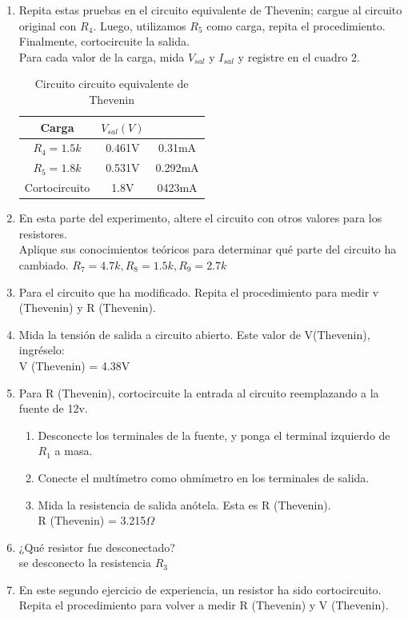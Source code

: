 \begin{enumerate}
\item Repita estas pruebas en el circuito equivalente de Thevenin; cargue al circuito original con $R_{4}$. Luego, utilizamos $R_{5}$ como carga, repita el procedimiento. Finalmente, cortocircuite la salida.
\\ 
Para cada valor de la carga, mida $V_{sal}$ y $I_{sal}$ y registre en el cuadro 2.
\begin{table}[h]
	\centering
	\begin{tabular}{|c|c|c|}
		\hline
		\textbf{Carga}&\textbf{$V_{sal} (V)$}&\text{$I_{sal} (mA)$}\\
		\hline
		$R_{4}=1.5k$&0.461V&0.31mA\\
		\hline
		$R_{5}=1.8k$&0.531V&0.292mA\\
		\hline
		Cortocircuito&1.8V&0423mA\\
		\hline
	\end{tabular}
	\caption{Circuito circuito equivalente de Thevenin}
\end{table}
	\item En esta parte del experimento, altere el circuito con otros valores para los resistores.
	\\ Aplique sus conocimientos teóricos para determinar qué parte del circuito ha cambiado.
	$R_{7}= 4.7k, R_{8}=1.5k, R_{9}=2.7k$
	\item Para el circuito que ha modificado. Repita el procedimiento para medir v (Thevenin) y R (Thevenin).
	\item Mida la tensión de salida a circuito abierto. Este valor de V(Thevenin), ingréselo:
	\\ V (Thevenin) = 4.38V
	\item Para R (Thevenin), cortocircuite la entrada al circuito reemplazando a la fuente de 12v.
	\begin{enumerate}
		\item Desconecte los terminales de la fuente, y ponga el terminal izquierdo de $R_{1}$ a masa.
		\item Conecte el multímetro como ohmímetro en los terminales de salida.
		\item Mida la resistencia de salida anótela. Esta es R (Thevenin).
		\\ R (Thevenin) = 3.215$\Omega$
	\end{enumerate}
	\item ¿Qué resistor fue desconectado?
	\\ se desconecto la resistencia $R_{3}$
	\item En este segundo ejercicio de experiencia, un resistor ha sido cortocircuito. Repita el procedimiento para volver a medir R (Thevenin) y V (Thevenin).

\end{enumerate}

